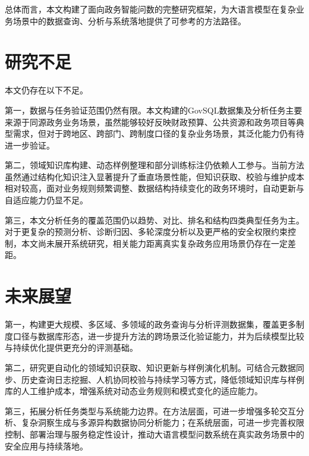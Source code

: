 总体而言，本文构建了面向政务智能问数的完整研究框架，为大语言模型在复杂业务场景中的数据查询、分析与系统落地提供了可参考的方法路径。

\section{研究不足}

本文仍存在以下不足。

第一，数据与任务验证范围仍然有限。本文构建的GovSQL数据集及分析任务主要来源于同源政务业务场景，虽然能够较好反映财政预算、公共资源和政务项目等典型需求，但对于跨地区、跨部门、跨制度口径的复杂业务场景，其泛化能力仍有待进一步验证。

第二，领域知识库构建、动态样例整理和部分训练标注仍依赖人工参与。当前方法虽然通过结构化知识注入显著提升了垂直场景性能，但知识获取、校验与维护成本相对较高，面对业务规则频繁调整、数据结构持续变化的政务环境时，自动更新与自适应能力仍显不足。

第三，本文分析任务的覆盖范围仍以趋势、对比、排名和结构四类典型任务为主。对于更复杂的预测分析、诊断归因、多轮深度分析以及更严格的安全权限约束控制，本文尚未展开系统研究，相关能力距离真实复杂政务应用场景仍存在一定差距。

\section{未来展望}

第一，构建更大规模、多区域、多领域的政务查询与分析评测数据集，覆盖更多制度口径与数据库形态，进一步提升方法的跨场景泛化验证能力，并为后续模型比较与持续优化提供更充分的评测基础。

第二，研究更自动化的领域知识获取、知识更新与样例演化机制。可结合元数据同步、历史查询日志挖掘、人机协同校验与持续学习等方式，降低领域知识库与样例库的人工维护成本，增强系统对动态业务规则和模式变化的适应能力。

第三，拓展分析任务类型与系统能力边界。在方法层面，可进一步增强多轮交互分析、复杂洞察生成与多源异构数据协同分析能力；在系统层面，可进一步完善权限控制、部署治理与服务稳定性设计，推动大语言模型问数系统在真实政务场景中的安全应用与持续落地。
